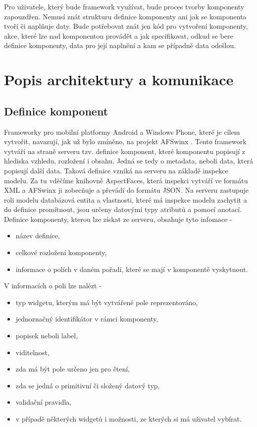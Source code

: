 Pro uživatele, který bude framework využívat, bude proces tvorby komponenty zapouzdřen. Nemusí znát strukturu definice komponenty ani jak se komponenta tvoří či naplňuje daty. Bude potřebovat znát jen kód pro vytvoření komponenty, akce, které lze nad komponentou provádět a jak specifikovat, odkud se bere definice komponenty, data pro její naplnění a kam se případně data odešlou.

\section{Popis architektury a komunikace}
\subsection{Definice komponent}
Frameworky pro mobilní platformy Android a Windows Phone, které je cílem vytvořit, navazují, jak už bylo zmíněno, na projekt AFSwinx \cite{tomasek-thesis}. Tento framework vytváří na straně serveru tzv. definice komponent, které komponentu popisují z hlediska vzhledu, rozložení i obsahu. Jedná se tedy o metadata\cite{https://en.wikipedia.org/wiki/Metadata}, neboli data, která popisují další data. Taková definice vzniká na serveru na základě inspekce modelu. Za tu vděčíme knihovně AspectFaces, která inspekci vytváří ve formátu XML a AFSwinx ji zobecňuje a převádí do formátu JSON. Na serveru zastupuje roli modelu databázová entita a vlastnosti, které má inspekce modelu zachytit a do definice promítnout, jsou určeny datovými typy atributů a pomocí anotací.
Definice komponenty, kterou lze získat ze serveru, obsahuje tyto infomace -
\begin{itemize}
\item název definice,
\item celkové rozložení komponenty,
\item informace o polích v daném pořadí, které se mají v komponentě vyskytnout.
\end{itemize}
V informacích o poli lze nalézt -
\begin{itemize}
\item typ widgetu, kterým má být vytvářené pole reprezentováno,
\item jednoznačný identifikátor v rámci komponenty,
\item popisek neboli label,
\item viditelnost,
\item zda má být pole určeno jen pro čtení,
\item zda se jedná o primitivní či složený datový typ,
\item validační pravidla,
\item v případě některých widgetů i možnosti, ze kterých si má uživatel vybírat.
\end{itemize}

